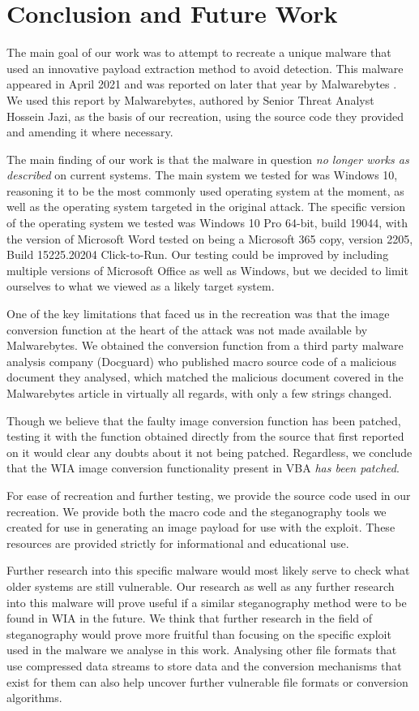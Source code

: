 \chapter{Conclusion and Future Work}
The main goal of our work was to attempt to recreate a unique malware that used an innovative payload extraction method
to avoid detection. This malware appeared in April 2021 and was reported on later that year by Malwarebytes
\cite{jazi-article}. We used this report by Malwarebytes, authored by Senior Threat Analyst Hossein Jazi, as the basis
of our recreation, using the source code they provided and amending it where necessary.

The main finding of our work is that the malware in question \emph{no longer works as described} on current systems. The
main system we tested for was Windows 10, reasoning it to be the most commonly used operating system at the moment, as
well as the operating system targeted in the original attack. %
The specific version of the operating system we tested was Windows 10 Pro 64-bit, build 19044, with the version of 
Microsoft Word tested on being a Microsoft 365 copy, version 2205, Build 15225.20204 Click-to-Run.
Our testing could be improved by including multiple versions of Microsoft Office as well as Windows, but we decided to
limit ourselves to what we viewed as a likely target system. 

One of the key limitations that faced us in the recreation was that the image conversion function at the heart of the
attack was not made available by Malwarebytes. We obtained the conversion function from a third party malware analysis
company (Docguard) who published macro source code of a malicious document they analysed, which matched the malicious
document covered in the Malwarebytes article in virtually all regards, with only a few strings changed.

Though we believe that the faulty image conversion function has been patched, testing it with the function obtained
directly from the source that first reported on it would clear any doubts about it not being patched. Regardless, we 
conclude that the \acrfull{WIA} image conversion functionality present in \acrshort{VBA} \emph{has been patched}.

For ease of recreation and further testing, we provide the source code used in our recreation. We provide both the
macro code and the steganography tools we created for use in generating an image payload for use with the exploit.
These resources are provided strictly for informational and educational use.

Further research into this specific malware would most likely serve to check what older systems are still vulnerable.
Our research as well as any further research into this malware will prove useful if a similar steganography method were
to be found in \acrshort{WIA} in the future. 
We think that further research in the field of steganography would prove more fruitful than focusing on the specific 
exploit used in the malware we analyse in this work. 
Analysing other file formats that use compressed data streams to store data and the conversion mechanisms that exist 
for them can also help uncover further vulnerable file formats or conversion algorithms. 


